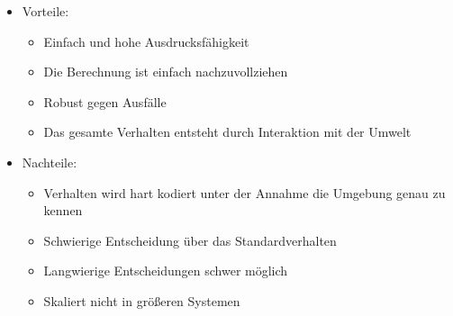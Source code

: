 \documentclass{article} %
\begin{document}
\begin{itemize}
\begin{enumerate}
		\end{enumerate}
		\item Vorteile:
		\begin{itemize}
			\item Einfach und hohe Ausdrucksfähigkeit
			\item Die Berechnung ist einfach nachzuvollziehen
			\item Robust gegen Ausfälle
			\item Das gesamte Verhalten entsteht durch Interaktion mit der Umwelt
		\end{itemize}
		\item Nachteile:
		\begin{itemize}
			\item Verhalten wird hart kodiert unter der Annahme die Umgebung genau zu kennen
			\item Schwierige Entscheidung über das Standardverhalten
			\item Langwierige Entscheidungen schwer möglich
			\item Skaliert nicht in größeren Systemen
		\end{itemize}
	\end{itemize}
\end{document}
